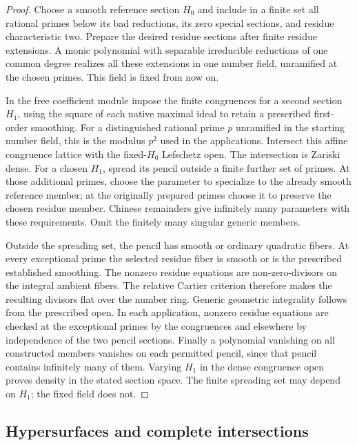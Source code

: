 \begin{proof}
Choose a smooth reference section $H_0$ and include in a finite
set all rational primes below its bad reductions, its zero special
sections, and residue characteristic two. Prepare the desired
residue sections after finite residue extensions. A monic
polynomial with separable irreducible reductions of one common
degree realizes all these extensions in one number field, unramified
at the chosen primes. This field is fixed from now on.

In the free coefficient module impose the finite congruences for a
second section $H_1$, using the square of each native maximal
ideal to retain a prescribed first-order smoothing. For a
distinguished rational prime $p$ unramified in the starting
number field, this is the modulus $p^2$ used in the applications.
Intersect this
affine congruence lattice with the fixed-$H_0$ Lefschetz open. The
intersection is Zariski dense. For a chosen $H_1$, spread its pencil
outside a finite further set of primes. At those additional primes,
choose the parameter to specialize to the already smooth reference
member; at the originally prepared primes choose it to preserve
the chosen residue member. Chinese remainders give infinitely many
parameters with these requirements. Omit the finitely many singular
generic members.

Outside the spreading set, the pencil has smooth or ordinary
quadratic fibers. At every exceptional prime the selected residue
fiber is smooth or is the prescribed established smoothing.
The nonzero residue equations are non-zero-divisors on the integral
ambient fibers. The relative Cartier criterion therefore makes the
resulting divisors flat over the number ring. Generic geometric
integrality follows from the prescribed open. In each application,
nonzero residue equations are checked at the exceptional primes by
the congruences and elsewhere by independence of the two pencil
sections. Finally a polynomial
vanishing on all constructed members vanishes on each permitted
pencil, since that pencil contains infinitely many of them. Varying
$H_1$ in the dense congruence open proves density in the stated
section space. The finite spreading set may depend on $H_1$; the
fixed field does not.
\end{proof}

\subsection{Hypersurfaces and complete intersections}

